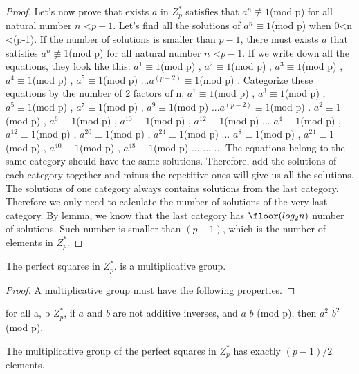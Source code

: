 \documentclass{article}
\begin{document}
\begin{proof}
Let's now prove that exists $a$ in $Z^*_p$ satisfies that $a^n \not \equiv 1$(mod p) for all natural number $n$ \textless $p-1$.
Let's find all the solutions of  $a^n  \equiv 1$(mod p) when $0$\textless n \textless (p-1).  If the number of solutions is smaller than $p-1$, there must exists $a$ that satisfies $a^n \not \equiv 1$(mod p) for all natural number $n$ \textless $p-1$. 
If we write down all the equations, they look like this:
 $a^1  \equiv 1$(mod p) , $a^2  \equiv 1$(mod p) , $a^3  \equiv 1$(mod p) , $a^4  \equiv 1$(mod p) , $a^5  \equiv 1$(mod p) ...$a^(p-2)  \equiv 1$(mod p) .
 Categorize these equations by the number of 2 factors of n.
 { $a^1  \equiv 1$(mod p) , $a^3  \equiv 1$(mod p) , $a^5  \equiv 1$(mod p) , $a^7  \equiv 1$(mod p) , $a^9  \equiv 1$(mod p) ...$a^(p-2)  \equiv 1$(mod p) .}
 { $a^2  \equiv 1$(mod p) , $a^6  \equiv 1$(mod p) , $a^10  \equiv 1$(mod p) , $a^12  \equiv 1$(mod p) ...}
 {$a^4  \equiv 1$(mod p) , $a^12  \equiv 1$(mod p) , $a^20  \equiv 1$(mod p) , $a^24  \equiv 1$(mod p) ...}
 {$a^8  \equiv 1$(mod p) , $a^24  \equiv 1$(mod p) , $a^40  \equiv 1$(mod p) , $a^48  \equiv 1$(mod p) ...}
 ...
 ...
 The equations belong to the same category should have the same solutions.
 Therefore, add the solutions of each category together and minus the repetitive ones will give us all the solutions.
 The solutions of one category always contains solutions from the last category.
 Therefore we only need to calculate the number of solutions of the very last category.
 By lemma, we know that the last category has $\floor (log_2 n)$ number of solutions. 
 Such number is smaller than $(p-1)$, which is the number of elements in  $Z^*_p$. 
 \end{proof}


 
\begin{theorem}
The perfect squares in $Z^*_p.$ is a multiplicative group.
\end{theorem}

\begin{proof}
A multiplicative group must have the following properties.
 \end{proof}
 
  \begin{lemma}
for all a, b \in $Z^*_p$, if $a$ and $b$ are not additive inverses, and $a$ \not \equiv $b$ (mod p), then $a^2$ \not \equiv $b^2$ (mod p). 
\end{lemma}
 
 \begin{lemma}
The multiplicative group of the perfect squares in $Z^*_p$ has exactly $(p-1)/2$ elements.
\end{lemma}
\end{document}
